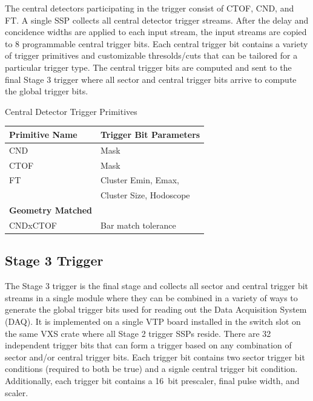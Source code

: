 The central detectors participating in the trigger consist of CTOF, CND, and FT. A single SSP collects all central detector trigger streams. After the delay and concidence widths are applied to each input stream, the input streams are copied to 8 programmable central trigger bits. Each central trigger bit contains a variety of trigger primitives and customizable thresolds/cuts that can be tailored for a particular trigger type. The central trigger bits are computed and sent to the final Stage 3 trigger where all sector and central trigger bits arrive to compute the global trigger bits.

\begin{center}
	Central Detector Trigger Primitives\\
	\begin{tabular}{| l | l |}
		\hline \hline
		Primitive Name			& Trigger Bit Parameters	\\
		\hline
		CND     			& Mask				\\
		CTOF    			& Mask				\\
		FT				& Cluster Emin, Emax, 		\\
						& Cluster Size, Hodoscope	\\
		{\bf Geometry Matched}		&				\\
		CNDxCTOF			& Bar match tolerance		\\
		\hline \hline
	\end{tabular}
\end{center}


\subsection{Stage 3 Trigger}

The Stage 3 trigger is the final stage and collects all sector and central trigger bit streams in a single module where they can be combined in a variety of ways to generate the global trigger bits used for reading out the Data Acquisition System (DAQ). It is implemented on a single VTP board installed in the switch slot on the same VXS crate where all Stage 2 trigger SSPs reside. There are 32 independent trigger bits that can form a trigger based on any combination of sector and/or central trigger bits. Each trigger bit contains two sector trigger bit conditions (required to both be true) and a signle central trigger bit condition. Additionally, each trigger bit contains a 16~bit prescaler, final pulse width, and scaler.

